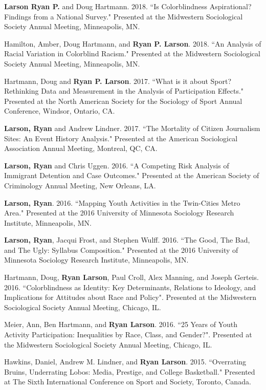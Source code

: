 \documentclass[letterpaper]{article}
\renewenvironment{itemize}{
  \begin{list}{}{
    \setlength{\leftmargin}{1.5em}
  }
}{
  \end{list}
}
\begin{document}
\begin{itemize}
\item \textbf{Larson Ryan P.} and Doug Hartmann. 2018. ``Is Colorblindness Aspirational? Findings from a National Survey." Presented at the Midwestern Sociological Society Annual Meeting, Minneapolis, MN. 
\item Hamilton, Amber, Doug Hartmann, and \textbf{Ryan P. Larson}. 2018. ``An Analysis of Racial Variation in Colorblind Racism." Presented at the Midwestern Sociological Society Annual Meeting, Minneapolis, MN. 
\item Hartmann, Doug and \textbf{Ryan P. Larson}. 2017. ``What is it about Sport? Rethinking Data and Measurement in the Analysis of Participation Effects."  Presented at the North American Society for the Sociology of Sport Annual Conference, Windsor, Ontario, CA. 
\item \textbf{Larson, Ryan} and Andrew Lindner. 2017. ``The Mortality of Citizen Journalism Sites: An Event History Analysis." Presented at the American Sociological Association Annual Meeting, Montreal, QC, CA.
\item \textbf{Larson, Ryan} and Chris Uggen. 2016. ``A Competing Risk Analysis of Immigrant Detention and Case Outcomes." Presented at the American Society of Criminology Annual Meeting, New Orleans, LA. 
\item \textbf{Larson, Ryan}. 2016. ``Mapping Youth Activities in the Twin-Cities Metro Area." Presented at the 2016 University of Minnesota Sociology Research Institute, Minneapolis, MN. 
\item \textbf{Larson, Ryan}, Jacqui Frost, and Stephen Wulff. 2016. ``The Good, The Bad, and The Ugly: Syllabus Composition." Presented at the 2016 University of Minnesota Sociology Research Institute, Minneapolis, MN. 
\item Hartmann, Doug, \textbf{Ryan Larson}, Paul Croll, Alex Manning,  and Joseph Gerteis. 2016. ``Colorblindness as Identity:  Key Determinants, Relations to Ideology, and Implications for Attitudes about Race and Policy". Presented at the Midwestern Sociological Society Annual Meeting, Chicago, IL. 
\item Meier, Ann, Ben Hartmann, and \textbf{Ryan Larson}. 2016. ``25 Years of Youth Activity Participation: Inequalities by Race, Class, and Gender?". Presented at the Midwestern Sociological Society Annual Meeting, Chicago, IL. 
\item Hawkins, Daniel, Andrew M. Lindner, and \textbf{Ryan Larson}. 2015. ``Overrating Bruins, Underrating Lobos: Media, Prestige, and College Basketball." Presented at The Sixth International Conference on Sport and Society, Toronto, Canada.

\end{itemize}
\end{document}
